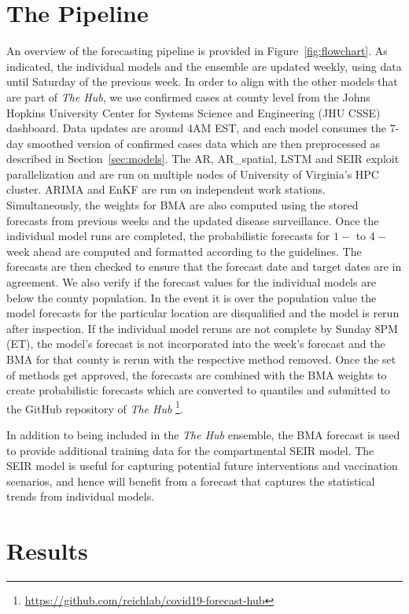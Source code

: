 \documentclass[sigconf]{acmart}
\newcommand{\hub}{\emph{The Hub}}
\newcommand{\ar}{AR}
\newcommand{\sar}{AR\_spatial}
\begin{document}
\section{The Pipeline}
An overview of the forecasting pipeline is provided in Figure~\ref{fig:flowchart}. As indicated, the individual models and the ensemble are updated weekly, using data until Saturday of the previous week. In order to align with the other models that are part of \hub{}, we use confirmed cases at county level from the Johns Hopkins University Center for Systems Science and Engineering (JHU CSSE)\cite{dong2020interactive} dashboard. Data updates are around 4AM EST, and each model consumes the 7-day smoothed version of confirmed cases data which are then preprocessed as described in Section~\ref{sec:models}.  The \ar, \sar, LSTM and SEIR exploit parallelization and are run on multiple nodes of University of Virginia's HPC cluster. ARIMA and EnKF are run on independent work stations. Simultaneously, the weights for BMA are also computed using the stored forecasts from previous weeks and the updated disease surveillance. Once the individual model runs are completed, the probabilistic forecasts for $1-$ to $4-$ week ahead are computed and formatted according to the guidelines. The forecasts are then checked to ensure that the forecast date and target dates are in agreement. We also verify if the forecast values for the individual models are below the county population. In the event it is over the population value the model forecasts for the particular location are disqualified and the model is rerun after inspection. If the individual model reruns are not complete by Sunday 8PM (ET), the model's forecast is not incorporated into the week's forecast and the BMA for that county is rerun with the respective method removed. Once the set of methods get approved, the forecasts are combined with the BMA weights to create probabilistic forecasts which are converted to quantiles and submitted to the GitHub repository of \hub{} \footnote{\url{https://github.com/reichlab/covid19-forecast-hub}}. 

In addition to being included in the \hub{} ensemble, the BMA forecast is used to provide additional training data for the compartmental SEIR model. The SEIR model is useful for capturing potential future interventions and vaccination scenarios, and hence will benefit from a forecast that captures the statistical trends from individual models. 

\section{Results}
\end{document}
